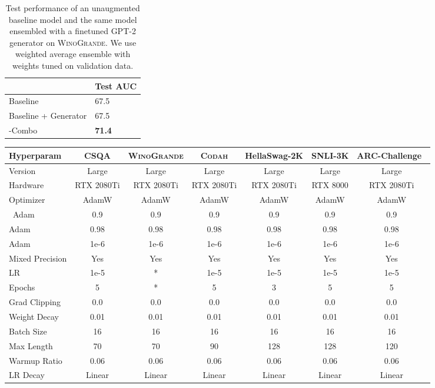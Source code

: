 \documentclass[11pt,a4paper]{article}
\newcommand{\gdaug}{}
\newcommand{\winogrande}{\textsc{WinoGrande}\xspace}
\newcommand{\codah}{\textsc{Codah}\xspace}
\newcommand{\roberta}{\textsc{RoBERTa}\xspace}
\begin{document}
\begin{table}[htbp!]
\centering
\footnotesize
\begin{tabular}{ll}
                    & Test AUC \\ \toprule
Baseline      & 67.5     \\ 
Baseline + Generator                      & 67.5 \\ 
\gdaug-Combo                      & \textbf{71.4}\\ 
\bottomrule
\end{tabular}
\caption{Test performance of an unaugmented baseline model and the same model ensembled with a finetuned GPT-2 generator on \winogrande. We use weighted average ensemble with weights tuned on validation data.  
}
\label{ensemble}
\end{table} 
\begin{table*}[t]
\begin{center}
\footnotesize
\begin{tabular}{lcccccc}
\toprule
\bf Hyperparam  & \bf CSQA & \bf \winogrande & \bf \codah &\bf HellaSwag-2K &\bf SNLI-3K &\bf ARC-Challenge\ \\
\midrule 
Version &Large &Large &Large &Large &Large &Large\\ 
Hardware &RTX 2080Ti &RTX 2080Ti &RTX 2080Ti  &RTX 2080Ti &RTX 8000 &RTX 2080Ti \\
Optimizer &AdamW    &AdamW  &AdamW &AdamW &AdamW &AdamW\\\
Adam  & 0.9   &0.9 &0.9 &0.9 &0.9 &0.9\\
Adam   & 0.98 &0.98  &0.98 &0.98 &0.98 &0.98\\
Adam  &1e-6  &1e-6  &1e-6 &1e-6 &1e-6 &1e-6 \\
Mixed Precision  &Yes  &Yes   &Yes    &Yes  &Yes &Yes\\

LR &1e-5 &* &1e-5 &1e-5  &1e-5 &1e-5\\
Epochs & 5 &* & 5 &3 &5 &5\\
Grad Clipping &0.0   &0.0 &0.0 &0.0 &0.0 &0.0\\
Weight Decay & 0.01 & 0.01 & 0.01 &0.01 &0.01 &0.01 \\
Batch Size & 16 & 16  & 16 &16 &16 &16 \\
Max Length &70  &70  &90  &128 &128 &120\\
Warmup Ratio & 0.06 & 0.06 & 0.06 &0.06 &0.06 &0.06\\
LR Decay & Linear &Linear & Linear &Linear &Linear &Linear  \\
\bottomrule
\end{tabular}
\end{center}
\caption{
  Hyperparameter settings for finetuning \roberta. Some hyperparameters for \winogrande are shown in a separate table as they vary with the training set size. 
}
\label{app:original_hyperparams}
\end{table*}
\end{document}
